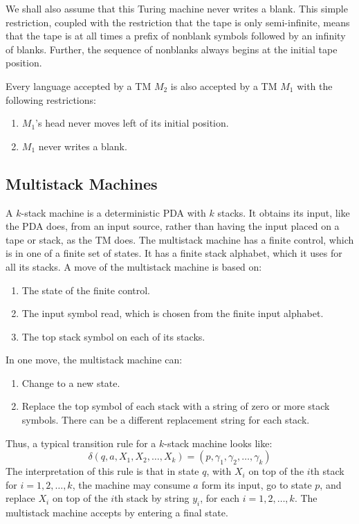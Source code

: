 \documentclass[]{article}
\begin{document}
We shall also assume that this Turing machine never writes a blank. This simple
restriction, coupled with the restriction that the tape is only semi-infinite,
means that the tape is at all times a prefix of nonblank symbols followed by an
infinity of blanks. Further, the sequence of nonblanks always begins at the
initial tape position.

\begin{thm}
Every language accepted by a TM $M_2$ is also accepted by a TM $M_1$ with the
following restrictions:
\begin{enumerate}
\item $M_1$'s head never moves left of its initial position.
\item $M_1$ never writes a blank.
\end{enumerate}
\end{thm}

\subsection*{Multistack Machines}
A $k$-stack machine is a deterministic PDA with $k$ stacks. It obtains its
input, like the PDA does, from an input source, rather than having the input
placed on a tape or stack, as the TM does. The multistack machine has a finite
control, which is in one of a finite set of states. It has a finite stack
alphabet, which it uses for all its stacks. A move of the multistack machine is
based on:
\begin{enumerate}
\item The state of the finite control.
\item The input symbol read, which is chosen from the finite input alphabet.
\item The top stack symbol on each of its stacks.
\end{enumerate}
In one move, the multistack machine can:
\begin{enumerate}
\item Change to a new state.
\item Replace the top symbol of each stack with a string of zero or more stack
symbols. There can be a different replacement string for each stack.
\end{enumerate}
Thus, a typical transition rule for a $k$-stack machine looks like:
\[ \delta(q, a, X_1, X_2, \ldots, X_k) = (p, \gamma_1, \gamma_2, \ldots,
\gamma_k)\]
The interpretation of this rule is that in state $q$, with $X_i$ on top of the
$i$th stack for $i = 1, 2, \ldots, k$, the machine may consume $a$ form its
input, go to state $p$, and replace $X_i$ on top of the $i$th stack by string
$y_i$, for each $i = 1, 2, \ldots, k$. The multistack machine accepts by
entering a final state.
\end{document}
